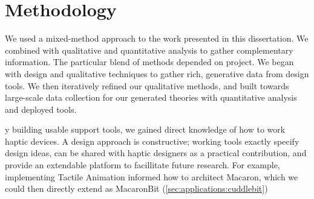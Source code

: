 %
%
\section{Methodology}
We used a mixed-method approach to the work presented in this dissertation.
We combined  with qualitative and quantitative analysis to gather complementary information.
The particular blend of methods depended on  project. %
We began with design and qualitative techniques to gather rich, generative data from design tools. %
We then iteratively refined our qualitative methods, and built towards large-scale data collection for our generated theories with quantitative analysis and deployed tools.


y building usable support tools, we gained direct knowledge of how to work haptic devices.
A design approach is constructive;
working tools exactly specify design ideas, can be shared with haptic designers as a practical contribution, and provide an extendable platform to facillitate future research.
For example, implementing Tactile Animation informed how to architect Macaron, which we could then directly extend as MacaronBit (\autoref{sec:applications:cuddlebit})


